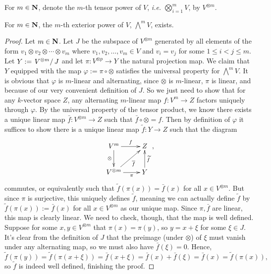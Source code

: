 \begin{ntn}
  For $m \in \boldsymbol{\mathbf{N}}$, denote the $m$-th tensor power of $V$, \emph{i.e.} $\bigotimes_{i=1}^m V$, by $V^{\otimes m}$.
\end{ntn}

\begin{pro}
  For $m \in \boldsymbol{\mathbf{N}}$, the $m$-th exterior power of $V$, $\bigwedge^m V$, exists.
  \begin{proof}
    Let $m \in \boldsymbol{\mathbf{N}}$. Let $J$ be the subspace of $V^{\otimes m}$ generated by all elements of the form $v_1 \otimes v_2 \otimes \cdots \otimes v_m$ where $v_1,v_2,\ldots,v_m \in V$ and $v_i = v_j$ for some $1 \le i < j \le m$. Let $Y := \left.V^{\otimes m}\right/J$ and let $\pi : V^{\otimes p} \to Y$ the natural projection map. We claim that $Y$ equipped with the map $\varphi := \pi \circ \otimes$ satisfies the universal property for $\bigwedge^m V$. It is obvious that $\varphi$ is $m$-linear and alternating, since $\otimes$ is $m$-linear, $\pi$ is linear, and because of our very convenient definition of $J$. So we just need to show that for any $k$-vector space $Z$, any alternating $m$-linear map $f: V^m \to Z$ factors uniquely through $\varphi$. By the universal property of the tensor product, we know there exists a unique linear map $\bar f: V^{\otimes m} \to Z$ such that $\bar f \circ \otimes = f$. Then by definition of $\varphi$ it suffices to show there is a unique linear map $\tilde f : Y \to Z$ such that the diagram 
\[ \xymatrix{ V^m \ar[d]_-\otimes \ar[r]^-f & Z \\ V^{\otimes m} \ar[ur]_-{\bar f} \ar[r]_-\pi & Y \ar[u]_-{\tilde f} }, \]
commutes, or equivalently such that $\tilde f(\pi(x)) = \bar f(x)$ for all $x \in V^{\otimes m}$. But since $\pi$ is surjective, this uniquely defines $\tilde f$, meaning we can actually define $\tilde f$ by $\tilde f(\pi(x)) := \bar f(x)$ for all $x \in V^{\otimes m}$ as our unique map. Since $\pi,\bar f$ are linear, this map is clearly linear. We need to check, though, that the map is well defined. Suppose for some $x,y \in V^{\otimes m}$ that $\pi(x) = \pi(y)$, so $y = x + \xi$ for some $\xi \in J$. It's clear from the definition of $J$ that the preimage (under $\otimes$) of $\xi$ must vanish under any alternating map, so we must also have $\bar f(\xi) = 0$. Hence, 
\[ \tilde f(\pi(y)) = \tilde f(\pi(x + \xi)) = \bar f(x + \xi) = \bar f(x) + \bar f(\xi) = \bar f(x) = \tilde f(\pi(x)), \]
so $\tilde f$ is indeed well defined, finishing the proof.
\end{proof}
\end{pro}

